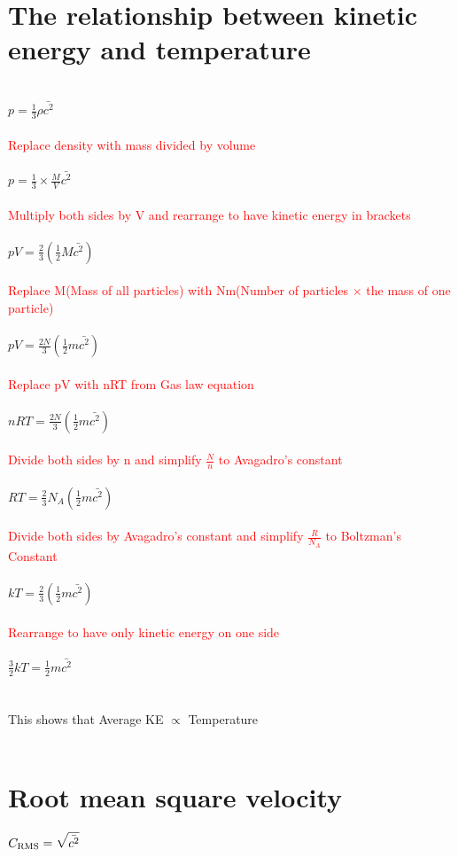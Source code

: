 \documentclass{article}[18pt]
\begin{document}
\section{The relationship between kinetic energy and temperature}
$ $\\
$p=\frac{1}{3}\rho\bar{c^2}$\\
\\
\textcolor{red}{Replace density with mass divided by volume}\\
\\
$p=\frac{1}{3}\times\frac{M}{V}\bar{c^2}$\\
\\
\textcolor{red}{Multiply both sides by V and rearrange to have kinetic energy in brackets}\\
\\
$pV=\frac{2}{3}(\frac{1}{2}M\bar{c^2})$\\
\\
\textcolor{red}{Replace M(Mass of all particles) with Nm(Number of particles $\times$ the mass of one particle)}\\
\\
$pV=\frac{2N}{3}(\frac{1}{2}m\bar{c^2})$\\
\\
\textcolor{red}{Replace pV with nRT from Gas law equation}\\
\\
$nRT=\frac{2N}{3}(\frac{1}{2}m\bar{c^2})$\\
\\
\textcolor{red}{Divide both sides by n and simplify $\frac{N}{n}$ to Avagadro's constant}\\
\\
$RT=\frac{2}{3}N_A(\frac{1}{2}m\bar{c^2})$\\
\\
\textcolor{red}{Divide both sides by Avagadro's constant and simplify $\frac{R}{N_A}$ to Boltzman's Constant}\\
\\
$kT=\frac{2}{3}(\frac{1}{2}m\bar{c^2})$\\
\\
\textcolor{red}{Rearrange to have only kinetic energy on one side}\\
\\
$\frac{3}{2}kT=\frac{1}{2}m\bar{c^2}$\\
\\
\\
This shows that Average KE $\propto$ Temperature\\
\\
\section{Root mean square velocity}
$C_\text{RMS}=\mathlarger{\sqrt{\bar{c^2}}}$
\end{document}
